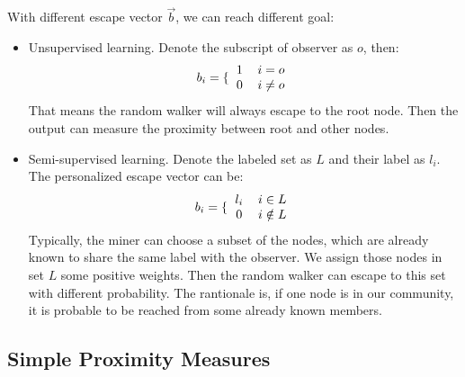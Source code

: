 \documentclass[11pt,a4paper]{article}
\begin{document}
\begin{itemize}
			With different escape vector $\overrightarrow{b}$, we can reach 
			different goal:
				\begin{itemize}
					\item Unsupervised learning. Denote the subscript of observer
					as $o$, then:
					\begin{equation}
						b_i=\lbrace{\begin{tabular}{cc}
							1 & $i=o$ \\
							0 & $i\neq o$ 
						\end{tabular}}
					\end{equation}
					That means the random walker will always escape to the root node. 
					Then the output can measure the proximity between root and other nodes. 
					\item Semi-supervised learning. Denote the labeled set as 
					$L$ and their label as $l_i$. The personalized escape 
					vector can be:
					\begin{equation}
						b_i=\lbrace{\begin{tabular}{cc}
							$l_i$ & $i \in L $ \\
							$0$ & $i\notin L $ 
						\end{tabular}}
					\end{equation}
					Typically, the miner can choose a subset of the nodes, which are
					already known to share the same label with the observer. We assign
					those nodes in set $L$ some positive weights. Then the random walker 
					can escape to this set with different probability. The rantionale is, 
					if one node is in our community, it is probable to be reached 
					from some already known members.  
				\end{itemize}

		\end{itemize}  
		
\subsection{Simple Proximity Measures}
\label{sec:prox_simple}
\end{document}
